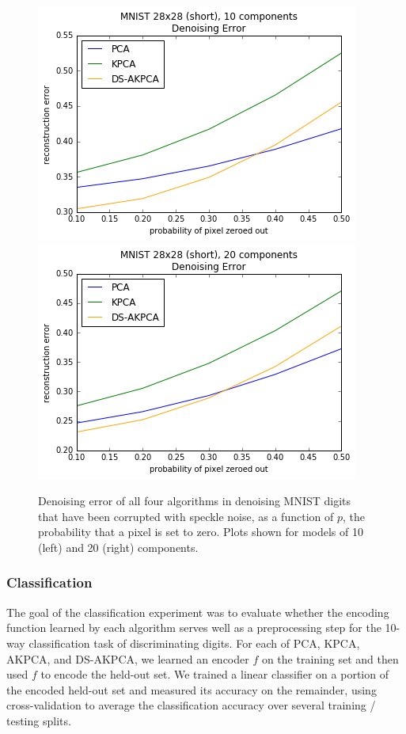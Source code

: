 \documentclass[]{article}
\begin{document}
\begin{figure}[!h]
\begin{center}
\includegraphics[scale=0.5]{figures/mnist_28_short_speckle_k10}
\includegraphics[scale=0.5]{figures/mnist_28_short_speckle_k20}
\caption{Denoising error of all four algorithms in denoising MNIST digits that have been corrupted with speckle noise, as a function of $p$, the probability that a pixel is set to zero.  Plots shown for models of 10 (left) and 20 (right) components.}
\label{speckle-denoising}
\end{center}
\end{figure}

\subsubsection{Classification}

The goal of the classification experiment was to evaluate whether the encoding function learned by each algorithm serves well as a preprocessing step for the 10-way classification task of discriminating digits.
For each of PCA, KPCA, AKPCA, and DS-AKPCA, we learned an encoder $f$ on the training set and then used $f$ to encode the held-out set.
We trained a linear classifier on a portion of the encoded held-out set and measured its accuracy on the remainder, using cross-validation to average the classification accuracy over several training / testing splits.
\end{document}
